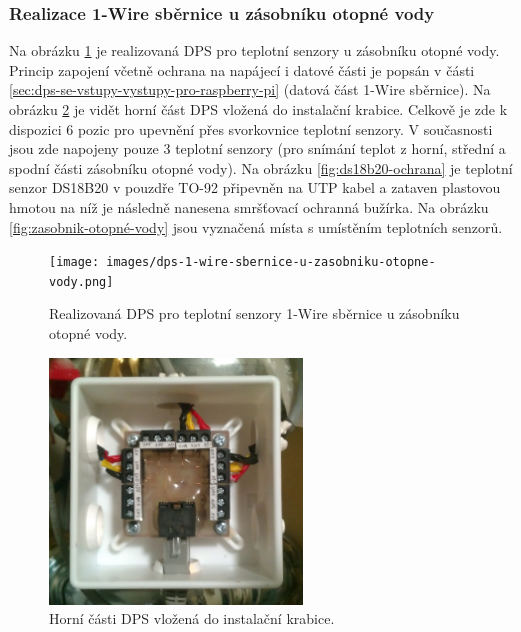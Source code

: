 \subsubsection{Realizace 1-Wire sběrnice u zásobníku otopné vody}
Na obrázku \ref{fig:dps-1-wire-sbernice-u-zasobniku-otopne-vody} je realizovaná DPS pro teplotní senzory u zásobníku otopné vody. Princip zapojení včetně ochrana na napájecí i datové části je popsán v části \ref{sec:dps-se-vstupy-vystupy-pro-raspberry-pi} (datová část 1-Wire sběrnice). Na obrázku \ref{fig:instalacni-krabice-cidla-u-zasobniku-otopne-vody} je vidět horní část DPS vložená do instalační krabice. Celkově je zde k dispozici 6 pozic pro upevnění přes svorkovnice teplotní senzory. V současnosti jsou zde napojeny pouze 3 teplotní senzory (pro snímání teplot z horní, střední a spodní části zásobníku otopné vody). Na obrázku \ref{fig:ds18b20-ochrana} je teplotní senzor DS18B20 v pouzdře TO-92 připevněn na UTP kabel a zataven plastovou hmotou na níž je následně nanesena smršťovací ochranná bužírka. Na obrázku \ref{fig:zasobnik-otopné-vody} jsou vyznačená místa s umístěním teplotních senzorů.

\begin{figure}[H]
    \centering
    \texttt{[image: images/dps-1-wire-sbernice-u-zasobniku-otopne-vody.png]}
    \caption{Realizovaná DPS pro teplotní senzory 1-Wire sběrnice u zásobníku otopné vody.}
    \label{fig:dps-1-wire-sbernice-u-zasobniku-otopne-vody}
\end{figure}

\begin{figure}[H]
    \centering
    \includegraphics[width=0.6\textwidth]{images/instalacni-krabice-cidla-u-zasobniku-otopne-vody.png}
    \caption{Horní části DPS vložená do instalační krabice.}
    \label{fig:instalacni-krabice-cidla-u-zasobniku-otopne-vody}
\end{figure}

